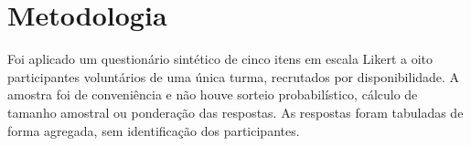 \section{Metodologia}
Foi aplicado um questionário sintético de cinco itens em escala Likert a oito participantes voluntários de uma única turma, recrutados por disponibilidade.
A amostra foi de conveniência e não houve sorteio probabilístico, cálculo de tamanho amostral ou ponderação das respostas.
As respostas foram tabuladas de forma agregada, sem identificação dos participantes.
